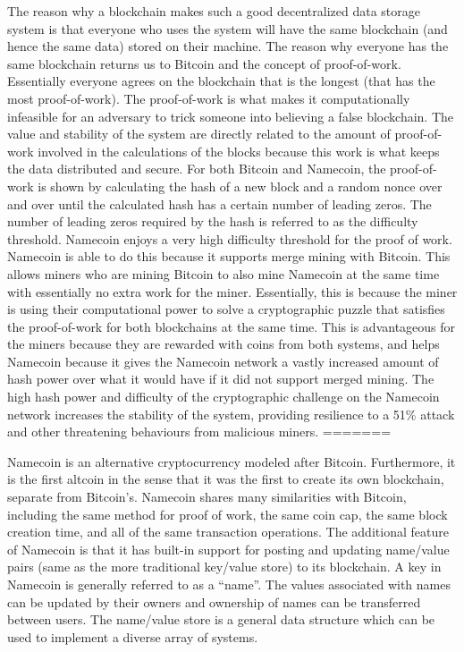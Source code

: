 The reason  why a blockchain makes such a good decentralized data storage system is that everyone who uses the system will have the same blockchain (and hence the same data) stored on their machine. The reason why everyone has the same blockchain returns us to Bitcoin and the concept of proof-of-work. Essentially everyone agrees on the blockchain that is the longest (that has the most proof-of-work). The proof-of-work is what makes it computationally infeasible for an adversary to trick someone into believing a false blockchain. The value and stability of the system are directly related to the amount of proof-of-work involved in the calculations of the blocks because this work is what keeps the data distributed and secure. For both Bitcoin and Namecoin, the proof-of-work is shown by calculating the hash of a new block and a random nonce over and over until the calculated hash has a certain number of leading zeros. The number of leading zeros required by the hash is referred to as the difficulty threshold. 
    Namecoin enjoys a very high difficulty threshold for the proof of work. Namecoin is able to do this because it supports merge mining with Bitcoin. This allows miners who are mining Bitcoin to also mine Namecoin at the same time with essentially no extra work for the miner. Essentially, this is because the miner is using their computational power to solve a cryptographic puzzle that satisfies the proof-of-work for both blockchains at the same time. This is advantageous for the miners because they are rewarded with coins from both systems, and helps Namecoin because it gives the Namecoin network a vastly increased amount of hash power over what it would have if it did not support merged mining. The high hash power and difficulty of the cryptographic challenge on the Namecoin network increases the stability of the system, providing resilience to a 51\% attack and other threatening behaviours from malicious miners. 
=======

Namecoin is an alternative cryptocurrency modeled after Bitcoin\cite{nakamoto2008bitcoin}. Furthermore, it is the first altcoin in the sense that it was the first to create its own blockchain, separate from Bitcoin's. Namecoin shares many similarities with Bitcoin, including the same method for proof of work, the same coin cap, the same block creation time, and all of the same transaction operations. The additional feature of Namecoin is that it has built-in support for posting and updating name/value pairs (same as the more traditional key/value store) to its blockchain. A key in Namecoin is generally referred to as a ``name''. The values associated with names can be updated by their owners and ownership of names can be transferred between users. The name/value store is a general data structure which can be used to implement a diverse array of systems.

